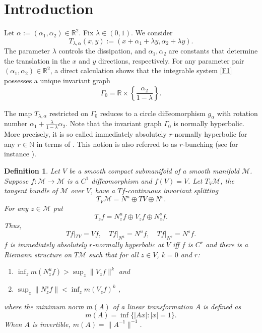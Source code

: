 \documentclass{amsart}
\newcommand{\N}{\mathbb{N}}
\newcommand{\R}{\mathbb{R}}
\newcommand{\la}{\lambda}
\newcommand{\al}{\alpha}
\newtheorem{Definition}{Definition}[section]
\begin{document}
	\section{\sc Introduction}
	Let $\alpha:=(\alpha_1,\alpha_2)\in \R^2$. Fix $\lambda\in (0,1)$. We consider
	\begin{equation}\label{F1}
		T_{\lambda,\alpha}(x,y):=(x+\alpha_1+\lambda y,\alpha_2+\lambda y).
	\end{equation}
	The parameter $\lambda$ controls the dissipation, and $\alpha_1,\alpha_2$
	are constants that determine the translation in the $x$ and $y$ directions, respectively. For any parameter pair $(\alpha_1,\alpha_2) \in \mathbb{R}^2$, a direct calculation shows that the integrable system \eqref{F1} possesses a unique invariant graph
	\begin{equation}\label{ingm1}
		\Gamma_0 = \mathbb{R} \times \left\{\frac{\alpha_2}{1-\lambda}\right\}.
	\end{equation}
	
	
	
	The map $T_{\la,\alpha}$ restricted on $\Gamma_0$ reduces to a circle diffeomorphism $g_\al$ with rotation number $\al_1+\frac{\lambda}{1-\lambda}\al_2$. Note that the invariant graph $\Gamma_0$  is normally hyperbolic. More precisely, it is  so called immediately absolutely $r$-normally hyperbolic for any $r\in\N$ in terms of \cite[Definition 2]{HPS}. This notion is also referred to as $r$-bunching (see for instance \cite{KH}).
	
	
	
	\begin{Definition}
		Let $V$ be a smooth compact submanifold of a smooth manifold $\mathcal M$.
		Suppose $f: \mathcal M \to \mathcal M$ is a $C^{1}$ diffeomorphism and $f(V) = V$.
		Let $T_V \mathcal M$, the tangent bundle of $\mathcal M$ over $V$, have a $Tf$-continuous invariant splitting
		\[
		T_V \mathcal M = N^u \oplus TV \oplus N^s .
		\]
		For any $z \in \mathcal M$ put
		\[
		T_z f = N^u_z f \oplus V_z f \oplus N^s_z f .
		\]
		Thus,
		\[
		Tf|_{TV} = Vf,\quad
		Tf|_{N^u} = N^u f,\quad
		Tf|_{N^s} = N^s f .
		\]
		$f$ is \emph{immediately absolutely $r$-normally hyperbolic at $V$} iff
		$f$ is $C^r$ and there is a Riemann structure on $T\mathcal M$ such that for all $z \in V$,
		$k=0$ and $r$:
		\begin{enumerate}
			\item[(a)] $\inf_z m(N^u_z f) > \sup_z \|V_z f\|^k$ \quad and
			\item[(b)] $\sup_z \|N^s_z f\| < \inf_z m(V_z f)^k$ ,
		\end{enumerate}
		where the minimum norm $m(A)$ of a linear transformation $A$ is defined as
		\[
		m(A) = \inf \{|Ax| : |x| = 1\} .
		\]
		When $A$ is invertible, $m(A) = \|A^{-1}\|^{-1}$.
	\end{Definition}
	
\end{document}

